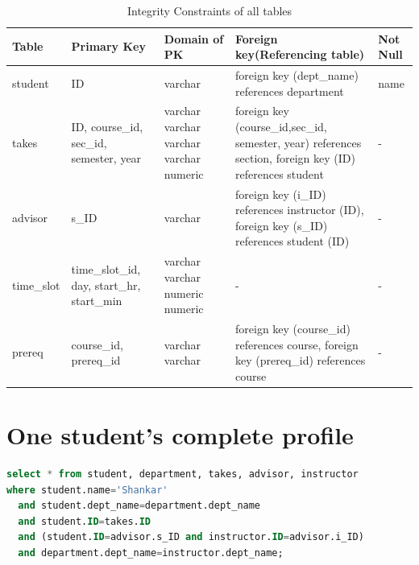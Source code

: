 \documentclass{article}
\begin{document}
\clearpage

    \begin{table}[ht]
\begin{tabular}{|p{2cm}|p{2cm}|p{2cm}|p{3cm}|p{1cm}|}
\hline    

\textbf{Table} & \textbf{Primary Key}  & \textbf{Domain of PK} & \textbf{Foreign key(Referencing
table)} & \textbf{Not Null}\\
 \hline
 
student & ID & varchar & foreign key (dept\_name) references department & name \\ \hline

takes & ID, course\_id, sec\_id, semester, year & varchar \newline varchar \newline varchar \newline varchar \newline numeric & foreign key (course\_id,sec\_id, semester, year) references section,
	 foreign key (ID) references student & - \\ \hline

advisor & s\_ID  & varchar & foreign key (i\_ID) references instructor (ID), foreign key (s\_ID) references student (ID) & - \\ \hline

time\_slot & time\_slot\_id, day, start\_hr, start\_min & varchar \newline varchar \newline numeric \newline numeric & - & - \\ \hline
	 
prereq & course\_id, prereq\_id & varchar \newline varchar & foreign key (course\_id) references course,
	 foreign key (prereq\_id) references course & -\\ \hline
	 

\end{tabular}
\caption{Integrity Constraints of all tables}
\end{table}

\newpage
\section{One student's complete profile}
\begin{lstlisting}[language=sql]
select * from student, department, takes, advisor, instructor
where student.name='Shankar' 
  and student.dept_name=department.dept_name 
  and student.ID=takes.ID 
  and (student.ID=advisor.s_ID and instructor.ID=advisor.i_ID) 
  and department.dept_name=instructor.dept_name;
\end{lstlisting}
\end{document}
